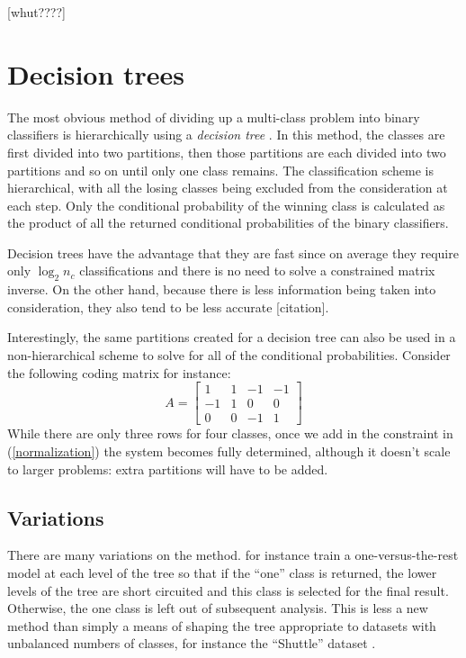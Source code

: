 \documentclass{article}
\begin{document}
[whut????]


\section{Decision trees}

The most obvious method of dividing up a multi-class problem into binary
classifiers is hierarchically using a {\it decision tree} 
\citep{Cheong_etal2004, Lee_Oh2003}.
In this method, the classes are first divided into two partitions, then
those partitions are each divided into two partitions and so on until only
one class remains. The classification scheme is hierarchical, with all the
losing classes being excluded from the consideration at each step.
Only the conditional probability of the winning class is calculated as the
product of all the returned conditional probabilities of the binary
classifiers.

Decision trees have the advantage that they are fast since on average they
require only $\log_2 n_c$ classifications and there is no need to solve a 
constrained matrix inverse. On the other hand, because there is less
information being taken into consideration, they also tend to be less
accurate [citation].

Interestingly, the same partitions created for a decision tree can also
be used in a non-hierarchical scheme
to solve for all of the conditional probabilities. Consider the following
coding matrix for instance:
\begin{equation}
A = 
\begin{bmatrix}
1 & 1 & -1 & -1 \\
-1 & 1 & 0 & 0 \\
0 & 0 & -1 & 1
\end{bmatrix}
\end{equation}
While there are only three rows for four classes, 
once we add in the constraint in (\ref{normalization}) the system becomes 
fully determined, although it doesn't scale to larger problems:
extra partitions will have to be added.

\subsection{Variations}

There are many variations on the method. \citet{Ramanan_etal2007} for instance train a 
one-versus-the-rest model at each level of the tree so that if the ``one''
class is returned, the lower levels of the tree are short circuited
and this class is selected for the final result. Otherwise, the one class
is left out of subsequent analysis. This is less a new method than simply
a means of shaping the tree appropriate to datasets with unbalanced
numbers of classes, for instance the ``Shuttle'' dataset \citep{King_etal1995}.
\end{document}
